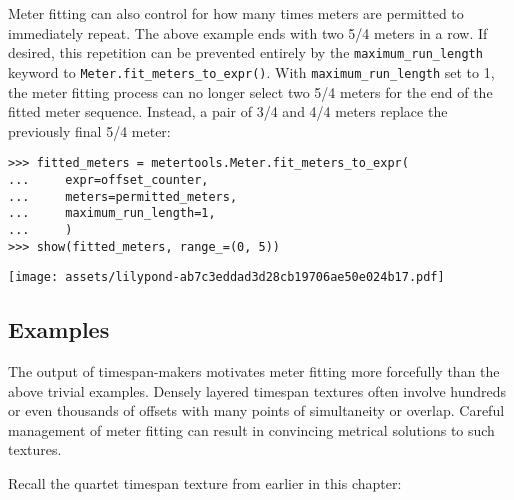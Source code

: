 \noindent Meter fitting can also control for how many times meters are
permitted to immediately repeat. The above example ends with two 5/4 meters in
a row. If desired, this repetition can be prevented entirely by the
\texttt{maximum\_run\_length} keyword to
\texttt{Meter.fit\_meters\_to\_expr()}. With \texttt{maximum\_run\_length} set
to 1, the meter fitting process can no longer select two 5/4 meters for the end
of the fitted meter sequence. Instead, a pair of 3/4 and 4/4 meters replace the
previously final 5/4 meter:

\begin{comment}
<abjad>
fitted_meters = metertools.Meter.fit_meters_to_expr(
    expr=offset_counter,
    meters=permitted_meters,
    maximum_run_length=1,
    )
show(fitted_meters, range_=(0, 5))
</abjad>
\end{comment}

\begin{singlespacing}
\vspace{-0.5\baselineskip}
\begin{lstlisting}
>>> fitted_meters = metertools.Meter.fit_meters_to_expr(
...     expr=offset_counter,
...     meters=permitted_meters,
...     maximum_run_length=1,
...     )
>>> show(fitted_meters, range_=(0, 5))
\end{lstlisting}
\noindent\texttt{[image: assets/lilypond-ab7c3eddad3d28cb19706ae50e024b17.pdf]}
\end{singlespacing}

\subsection{Examples}

The output of timespan-makers motivates meter fitting more forcefully than the
above trivial examples. Densely layered timespan textures often involve
hundreds or even thousands of offsets with many points of simultaneity or
overlap. Careful management of meter fitting can result in convincing metrical
solutions to such textures.

Recall the quartet timespan texture from earlier in this chapter:

\begin{comment}
<abjad>
music_specifiers = collections.OrderedDict([
    ('Voice 1', None),
    ('Voice 2', None),
    ('Voice 3', None),
    ('Voice 4', None),
    ])
target_timespan = timespantools.Timespan(0, (19, 4))
timespan_inventory = talea_timespan_maker(
    music_specifiers=music_specifiers,
    target_timespan=target_timespan,
    )
show(timespan_inventory, key='voice_name')
</abjad>
\end{comment}

